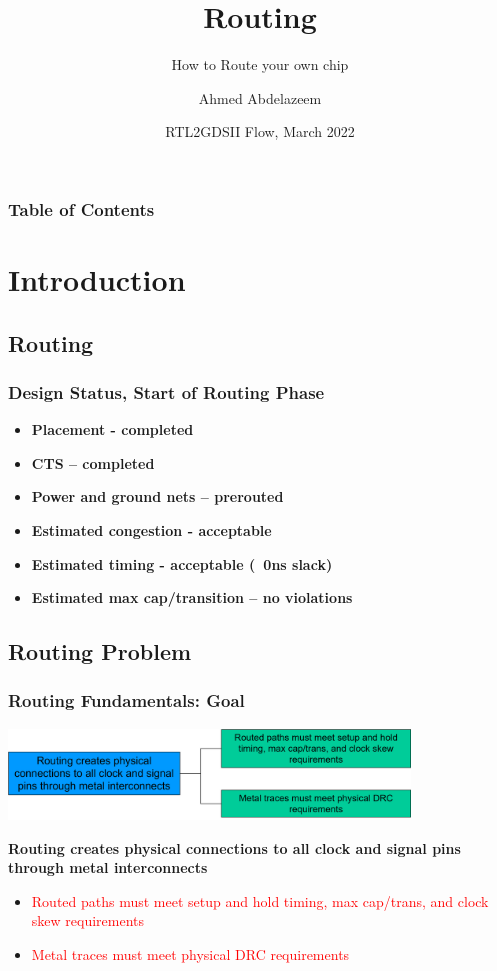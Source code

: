 \documentclass[compress]{beamer}
\title[ASIC Physical Design] %
{Routing}
\subtitle{How to Route your own chip}
\author[Ahmed Abdelazeem] %
{Ahmed Abdelazeem}
\institute[ZU] %
{
	Faculty of Engineering\\
	Zagazig University
}
\date[ZU 2023] %
{RTL2GDSII Flow, March 2022}
\begin{document}
	
	\frame{\titlepage}
	
	
	\begin{frame}
		\frametitle{Table of Contents}
		\tableofcontents
	\end{frame}
	\section[Intro]{Introduction}
	\subsection[Routing]{Routing}
	\begin{frame}
		\frametitle{Design Status, Start of Routing Phase}
		\begin{itemize}
			\item \textbf{Placement - completed}
			\item \textbf{CTS – completed}
			\item \textbf{Power and ground nets – prerouted}
			\item \textbf{Estimated congestion - acceptable}
			\item \textbf{Estimated timing - acceptable (~0ns slack)}
			\item \textbf{Estimated max cap/transition – no violations}
		\end{itemize}
	
	\end{frame}	
	\subsection[Route]{Routing Problem}
	\begin{frame}
		\frametitle{Routing Fundamentals: Goal}
		\begin{center}
			\includegraphics[width=0.8\textwidth]{Route}
		\end{center}
	\textbf{Routing creates physical connections to all clock and signal pins through metal interconnects}
		\begin{itemize}
			\item \textcolor{red}{Routed paths must meet setup and hold timing, max
				cap/trans, and clock skew requirements}
			\item \textcolor{red}{Metal traces must meet physical DRC requirements}

		\end{itemize}
			
	\end{frame}
	
\end{document}
